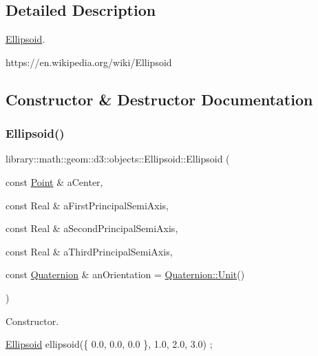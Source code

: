 \subsection{Detailed Description}
\hyperlink{classlibrary_1_1math_1_1geom_1_1d3_1_1objects_1_1_ellipsoid}{Ellipsoid}. 

https\+://en.wikipedia.\+org/wiki/\+Ellipsoid 

\subsection{Constructor \& Destructor Documentation}
\mbox{\label{classlibrary_1_1math_1_1geom_1_1d3_1_1objects_1_1_ellipsoid_aae81fe0edc7f0e8d4590ea89ae73cb14}} 
\subsubsection{\texorpdfstring{Ellipsoid()}{Ellipsoid()}}
{\footnotesize\ttfamily library\+::math\+::geom\+::d3\+::objects\+::\+Ellipsoid\+::\+Ellipsoid (\begin{DoxyParamCaption}\item[{const \hyperlink{classlibrary_1_1math_1_1geom_1_1d3_1_1objects_1_1_point}{Point} \&}]{a\+Center,  }\item[{const Real \&}]{a\+First\+Principal\+Semi\+Axis,  }\item[{const Real \&}]{a\+Second\+Principal\+Semi\+Axis,  }\item[{const Real \&}]{a\+Third\+Principal\+Semi\+Axis,  }\item[{const \hyperlink{classlibrary_1_1math_1_1geom_1_1trf_1_1rot_1_1_quaternion}{Quaternion} \&}]{an\+Orientation = {\ttfamily \hyperlink{classlibrary_1_1math_1_1geom_1_1trf_1_1rot_1_1_quaternion_aa7cb20c2918d117edb85073bffb3a381}{Quaternion\+::\+Unit}()} }\end{DoxyParamCaption})}



Constructor. 


\begin{DoxyCode}
\hyperlink{classlibrary_1_1math_1_1geom_1_1d3_1_1objects_1_1_ellipsoid_aae81fe0edc7f0e8d4590ea89ae73cb14}{Ellipsoid} ellipsoid(\{ 0.0, 0.0, 0.0 \}, 1.0, 2.0, 3.0) ;
\end{DoxyCode}



